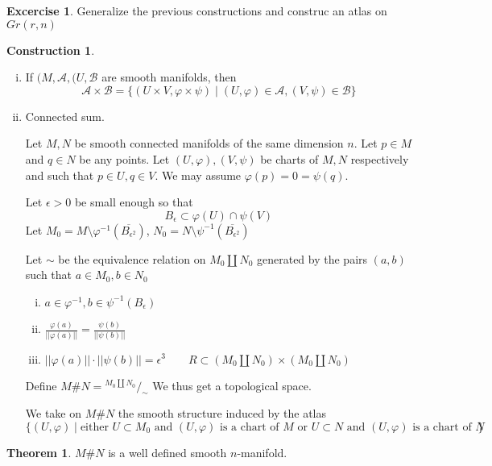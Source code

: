 \documentclass[]{book}
\theoremstyle{definition}
\theoremstyle{definition}
\theoremstyle{definition}
\newtheorem{thm}{Theorem}[section]
\theoremstyle{definition}
\theoremstyle{definition}
\theoremstyle{definition}
\theoremstyle{definition}
\theoremstyle{definition}
\theoremstyle{definition}
\theoremstyle{definition}
\newtheorem{exercise}{Excercise}
\theoremstyle{definition}
\newtheorem*{construction}{Construction}
\newcommand*\quot[2]{{^{\textstyle #1}\big/_{\textstyle #2}}}
\begin{document}
\begin{exercise}
  Generalize the previous constructions and construc an atlas on $Gr(r,n)$
\end{exercise}

\begin{construction}
   \begin{enumerate}[i)]
     \item If $(M,\mathcal{A},(U,\mathcal{B}$ are smooth manifolds, then
       \[
         \mathcal{A}\times \mathcal{B}= \lbrace (U \times  V, \varphi \times \psi) \mid
         (U,\varphi)\in \mathcal{A}, (V,\psi)\in \mathcal{B} \rbrace
       \] 
     \item Connected sum.

       Let $M,N$ be smooth connected manifolds of the same dimension $n$. Let $p\in M$ and $q\in N$ be
       any points. Let $(U,\varphi),(V,\psi)$ be charts of $M,N$ respectively and such that $p\in
       U,q\in V$. We may assume $\varphi(p)=0=\psi(q)$.
      
       Let $\epsilon >0 $ be small enough so that
       \[
         B_{\epsilon} \subset \varphi(U)\cap \psi(V)
       \] 
       Let $M_0=M\setminus \varphi^{-1}(\overline{B_{\epsilon^2}})$, $N_0=N\setminus
       \psi^{-1}(\overline{B_{\epsilon^2}})$

       Let $\sim$ be the equivalence relation on $M_0\coprod N_0$ generated by the pairs $(a,b)$ 
       such that $a\in M_0, b\in N_0$ 
       \begin{enumerate}[i)]
         \item $a\in \varphi^{-1}, b\in\psi^{-1}(B_{\epsilon})$
         \item $\frac{\varphi(a)}{|| \varphi(a) || }= \frac{\psi(b)}{|| \psi(b) || }$ 
         \item $|| \varphi(a) || \cdot || \psi(b) || = \epsilon^3 \quad \quad R \subset (M_0 \coprod
           N_0)\times (M_0 \coprod N_0)$
       \end{enumerate}
       Define $M\#N= \quot{M_0\coprod N_0}{\sim}$ 
       We thus get a topological space.

       We take on $M\#N$ the smooth structure induced by the atlas
       \[
         \lbrace (U,\varphi) \mid \text{either $U \subset M_0$ and $(U,\varphi)$ is a chart of $M$ or
         $U\subset N$ and $(U,\varphi)$ is a chart of $N$}\rbrace 
       \] 
   \end{enumerate}
  \end{construction}
   \begin{thm}
      $M\# N$ is a well defined smooth $n$-manifold.
   \end{thm}
\end{document}
